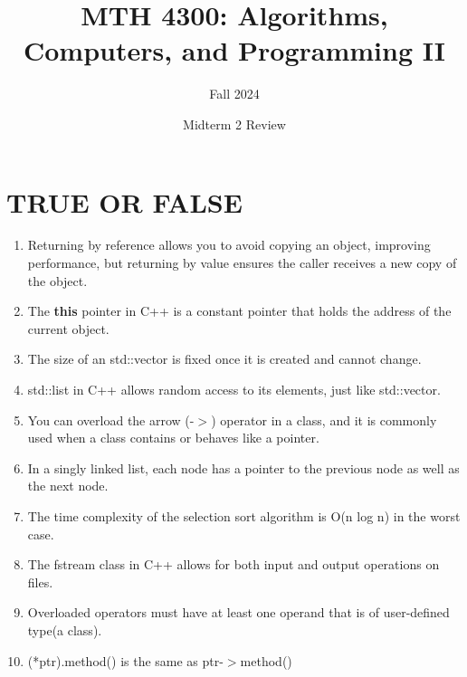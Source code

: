 \documentclass[a4paper]{article}
\title{MTH 4300: Algorithms, Computers, and Programming II}
\author{Fall 2024}
\date{Midterm 2 Review}
\begin{document}
\maketitle


\section{TRUE OR FALSE}
\begin{enumerate}
    \item  Returning by reference allows you to avoid copying an object, 
           improving performance, but returning by value ensures the caller
           receives a new copy of the object.
    \item The \textbf{this} pointer in C++ is a constant pointer that holds the address
          of the current object.
    \item The size of an std::vector is fixed once it is created and cannot change.
    \item std::list in C++ allows random access to its elements, just like std::vector.
    \item You can overload the arrow (-$>$) operator in a class, and it is commonly
          used when a class contains or behaves like a pointer.
    \item In a singly linked list, each node has a pointer to the previous node as well as the next node.
    \item The time complexity of the selection sort algorithm is O(n log n) in the worst case.
    \item The fstream class in C++ allows for both input and output operations on files.
    \item Overloaded operators must have at least one operand that is of user-defined type(a class).
    \item (*ptr).method() is the same as ptr-$>$method()  
\end{enumerate}
\newpage
\end{document}
